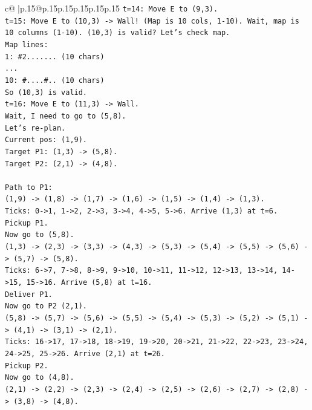 \documentclass{article}
\begin{document}
{\begin{supertabular}{c@{$\;$}|p{.15\linewidth}@{}p{.15\linewidth}p{.15\linewidth}p{.15\linewidth}p{.15\linewidth}p{.15\linewidth}}
{{{\texttt{t=14: Move E to (9,3).} \\
\texttt{t=15: Move E to (10,3) {-}> Wall! (Map is 10 cols, 1{-}10). Wait, map is 10 columns (1{-}10). (10,3) is valid? Let's check map.} \\
\texttt{Map lines:} \\
\texttt{1: \#2....... (10 chars)} \\
\texttt{...} \\
\texttt{10: \#....\#.. (10 chars)} \\
\texttt{So (10,3) is valid.} \\
\texttt{t=16: Move E to (11,3) {-}> Wall.} \\
\texttt{Wait, I need to go to (5,8).} \\
\texttt{Let's re{-}plan.} \\
\texttt{Current pos: (1,9).} \\
\texttt{Target P1: (1,3) {-}> (5,8).} \\
\texttt{Target P2: (2,1) {-}> (4,8).} \\
\\ 
\texttt{Path to P1:} \\
\texttt{(1,9) {-}> (1,8) {-}> (1,7) {-}> (1,6) {-}> (1,5) {-}> (1,4) {-}> (1,3).} \\
\texttt{Ticks: 0{-}>1, 1{-}>2, 2{-}>3, 3{-}>4, 4{-}>5, 5{-}>6. Arrive (1,3) at t=6.} \\
\texttt{Pickup P1.} \\
\texttt{Now go to (5,8).} \\
\texttt{(1,3) {-}> (2,3) {-}> (3,3) {-}> (4,3) {-}> (5,3) {-}> (5,4) {-}> (5,5) {-}> (5,6) {-}> (5,7) {-}> (5,8).} \\
\texttt{Ticks: 6{-}>7, 7{-}>8, 8{-}>9, 9{-}>10, 10{-}>11, 11{-}>12, 12{-}>13, 13{-}>14, 14{-}>15, 15{-}>16. Arrive (5,8) at t=16.} \\
\texttt{Deliver P1.} \\
\texttt{Now go to P2 (2,1).} \\
\texttt{(5,8) {-}> (5,7) {-}> (5,6) {-}> (5,5) {-}> (5,4) {-}> (5,3) {-}> (5,2) {-}> (5,1) {-}> (4,1) {-}> (3,1) {-}> (2,1).} \\
\texttt{Ticks: 16{-}>17, 17{-}>18, 18{-}>19, 19{-}>20, 20{-}>21, 21{-}>22, 22{-}>23, 23{-}>24, 24{-}>25, 25{-}>26. Arrive (2,1) at t=26.} \\
\texttt{Pickup P2.} \\
\texttt{Now go to (4,8).} \\
\texttt{(2,1) {-}> (2,2) {-}> (2,3) {-}> (2,4) {-}> (2,5) {-}> (2,6) {-}> (2,7) {-}> (2,8) {-}> (3,8) {-}> (4,8).} \\
}}}
\end{supertabular}}
\end{document}
